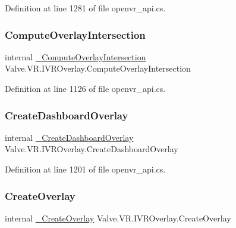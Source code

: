 Definition at line 1281 of file openvr\+\_\+api.\+cs.

\mbox{\label{struct_valve_1_1_v_r_1_1_i_v_r_overlay_a7088870eec230f7fbca0e9444d55c3b0}} 
\subsubsection{\texorpdfstring{ComputeOverlayIntersection}{ComputeOverlayIntersection}}
{\footnotesize\ttfamily internal \mbox{\hyperlink{struct_valve_1_1_v_r_1_1_i_v_r_overlay_a16aaf361f64b74515f0f9455b9e1aaaf}{\+\_\+\+Compute\+Overlay\+Intersection}} Valve.\+V\+R.\+I\+V\+R\+Overlay.\+Compute\+Overlay\+Intersection}



Definition at line 1126 of file openvr\+\_\+api.\+cs.

\mbox{\label{struct_valve_1_1_v_r_1_1_i_v_r_overlay_a9f874853fb39bf3ed675c27304384a03}} 
\subsubsection{\texorpdfstring{CreateDashboardOverlay}{CreateDashboardOverlay}}
{\footnotesize\ttfamily internal \mbox{\hyperlink{struct_valve_1_1_v_r_1_1_i_v_r_overlay_ad5cf0a30a2b92327fbcd10781baa7b2e}{\+\_\+\+Create\+Dashboard\+Overlay}} Valve.\+V\+R.\+I\+V\+R\+Overlay.\+Create\+Dashboard\+Overlay}



Definition at line 1201 of file openvr\+\_\+api.\+cs.

\mbox{\label{struct_valve_1_1_v_r_1_1_i_v_r_overlay_af7c60bfaea714393469d894b4f72d325}} 
\subsubsection{\texorpdfstring{CreateOverlay}{CreateOverlay}}
{\footnotesize\ttfamily internal \mbox{\hyperlink{struct_valve_1_1_v_r_1_1_i_v_r_overlay_a668f4b8031576ec88d6b713b995592af}{\+\_\+\+Create\+Overlay}} Valve.\+V\+R.\+I\+V\+R\+Overlay.\+Create\+Overlay}



